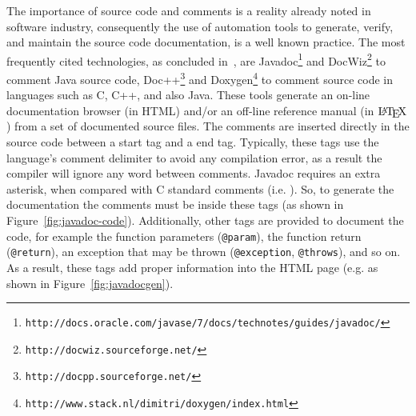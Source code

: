 The importance of source code and comments is a reality already noted in software industry, consequently the use of automation tools to generate, verify, and maintain the source code documentation, is a well known practice. The most frequently cited technologies, as concluded in~\citep{forward2002relevance}, are Javadoc\footnote{\texttt{http://docs.oracle.com/javase/7/docs/technotes/guides/javadoc/}} and DocWiz\footnote{\texttt{http://docwiz.sourceforge.net/}} to comment Java source code, Doc++\footnote{\texttt{http://docpp.sourceforge.net/}} and Doxygen\footnote{\texttt{http://www.stack.nl/dimitri/doxygen/index.html}} to comment source code in languages such as C, C++, and also Java. These tools generate an on-line documentation browser (in HTML) and/or an off-line reference manual (in $\mbox{\LaTeX}$) from a set of documented source files. The comments are inserted directly in the source code between a start tag and a end tag. Typically, these tags use the language's comment delimiter to avoid any compilation error, as a result the compiler will ignore any word between comments. Javadoc requires an extra asterisk, when compared with C standard comments (i.e. \pythoninline{/* */}). So, to generate the documentation the comments must be inside these tags (as shown in Figure~\ref{fig:javadoc-code}). Additionally, other tags are provided to document the code, for example the function parameters (\texttt{@param}), the function return (\texttt{@return}), an exception that may be thrown (\texttt{@exception}, \texttt{@throws}), and so on. As a result, these tags add proper information into the HTML page (e.g. as shown in Figure~\ref{fig:javadocgen}).

